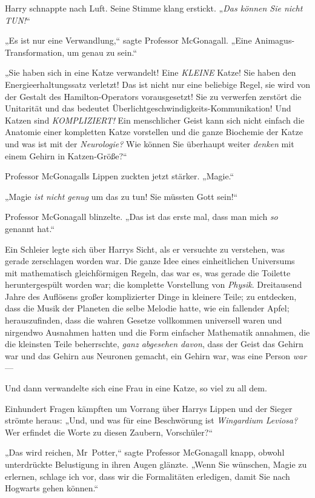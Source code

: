 {Harry schnappte nach Luft. Seine Stimme klang erstickt. „\emph{Das können Sie nicht TUN!}“

„Es ist nur eine Verwandlung,“ sagte Professor McGonagall. „Eine Animagus-Transformation, um genau zu sein.“

„Sie haben sich in eine Katze verwandelt! Eine \emph{KLEINE} Katze! Sie haben den Energieerhaltungssatz verletzt! Das ist nicht nur eine beliebige Regel, sie wird von der Gestalt des Hamilton-Operators vorausgesetzt! Sie zu verwerfen zerstört die Unitarität und das bedeutet Überlichtgeschwindigkeits-Kommunikation! Und Katzen sind \emph{KOMPLIZIERT!} Ein menschlicher Geist kann sich nicht einfach die Anatomie einer kompletten Katze vorstellen und die ganze Biochemie der Katze und was ist mit der \emph{Neurologie?} Wie können Sie überhaupt weiter \emph{denken} mit einem Gehirn in Katzen-Größe?“

Professor McGonagalls Lippen zuckten jetzt stärker. „Magie.“

„Magie \emph{ist nicht genug} um das zu tun! Sie müssten Gott sein!“

Professor McGonagall blinzelte. „Das ist das erste mal, dass man mich \emph{so} genannt hat.“

Ein Schleier legte sich über Harrys Sicht, als er versuchte zu verstehen, was gerade zerschlagen worden war. Die ganze Idee eines einheitlichen Universums mit mathematisch gleichförmigen Regeln, das war es, was gerade die Toilette heruntergespült worden war; die komplette Vorstellung von \emph{Physik}. Dreitausend Jahre des Auflösens großer komplizierter Dinge in kleinere Teile; zu entdecken, dass die Musik der Planeten die selbe Melodie hatte, wie ein fallender Apfel; herauszufinden, dass die wahren Gesetze vollkommen universell waren und nirgendwo Ausnahmen hatten und die Form einfacher Mathematik annahmen, die die kleinsten Teile beherrschte, \emph{ganz abgesehen davon}, dass der Geist das Gehirn war und das Gehirn aus Neuronen gemacht, ein Gehirn war, was eine Person \emph{war}—

Und dann verwandelte sich eine Frau in eine Katze, so viel zu all dem.

Einhundert Fragen kämpften um Vorrang über Harrys Lippen und der Sieger strömte heraus: „Und, und was für eine Beschwörung ist \emph{Wingardium Leviosa?} Wer erfindet die Worte zu diesen Zaubern, Vorschüler?“

„Das wird reichen, Mr~Potter,“ sagte Professor McGonagall knapp, obwohl unterdrückte Belustigung in ihren Augen glänzte. „Wenn Sie wünschen, Magie zu erlernen, schlage ich vor, dass wir die Formalitäten erledigen, damit Sie nach Hogwarts gehen können.“

}
